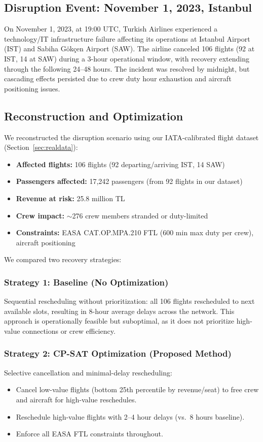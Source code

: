 \documentclass[12pt,number]{elsarticle}
\begin{document}
\subsection{Disruption Event: November 1, 2023, Istanbul}

On November 1, 2023, at 19:00 UTC, Turkish Airlines experienced a technology/IT infrastructure failure affecting its operations at Istanbul Airport (IST) and Sabiha Gökçen Airport (SAW). The airline canceled 106 flights (92 at IST, 14 at SAW) during a 3-hour operational window, with recovery extending through the following 24--48 hours. The incident was resolved by midnight, but cascading effects persisted due to crew duty hour exhaustion and aircraft positioning issues.

\subsection{Reconstruction and Optimization}

We reconstructed the disruption scenario using our IATA-calibrated flight dataset (Section~\ref{sec:realdata}):

\begin{itemize}
\item \textbf{Affected flights:} 106 flights (92 departing/arriving IST, 14 SAW)
\item \textbf{Passengers affected:} 17,242 passengers (from 92 flights in our dataset)
\item \textbf{Revenue at risk:} 25.8 million TL
\item \textbf{Crew impact:} $\sim$276 crew members stranded or duty-limited
\item \textbf{Constraints:} EASA CAT.OP.MPA.210 FTL (600 min max duty per crew), aircraft positioning
\end{itemize}

We compared two recovery strategies:

\subsubsection{Strategy 1: Baseline (No Optimization)}
Sequential rescheduling without prioritization: all 106 flights rescheduled to next available slots, resulting in 8-hour average delays across the network. This approach is operationally feasible but suboptimal, as it does not prioritize high-value connections or crew efficiency.

\subsubsection{Strategy 2: CP-SAT Optimization (Proposed Method)}
Selective cancellation and minimal-delay rescheduling:
\begin{itemize}
\item Cancel low-value flights (bottom 25th percentile by revenue/seat) to free crew and aircraft for high-value reschedules.
\item Reschedule high-value flights with 2--4 hour delays (vs.\ 8 hours baseline).
\item Enforce all EASA FTL constraints throughout.
\end{itemize}
\end{document}
